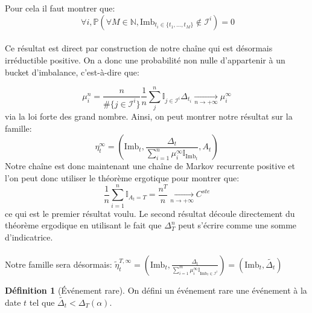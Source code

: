 \documentclass[12pt,a4paper]{article}
\theoremstyle{definition}
\newtheorem{definition}[theorem]{Définition}
\theoremstyle{remark}
\begin{document}
\\
\\
Pour cela il faut montrer que:
$$ \ \forall i,  \mathbb{P}\left(\forall M \in \mathbb{N}, \text{Imb}_{t_i\in\{t_1,\dots,t_M\}}\notin \mathcal{I}^{i}\right) = 0$$
\\
Ce résultat est direct par construction de notre chaîne qui est désormais irréductible positive. On a donc une probabilité non nulle d'appartenir à un bucket d'imbalance, c'est-à-dire que:

$$\mu_i^n = \frac{n}{\#\{j\in \mathcal I^i\}}\frac{1}{n}\sum_{j}^n\mathbb{I}_{j\in \mathcal I^i}\Delta_{t_i}\underset{n\to+\infty}{\to}\mu_i^{\infty}$$
via la loi forte des grand nombre. Ainsi, on peut montrer notre résultat sur la famille:
$$\eta_t^{\infty} = \left(\text{Imb}_t, \frac{\Delta_t}{\sum_{i=1}^n\mu_i^{\infty}\mathbb{I}_{\text{Imb}_t}}, A_t\right)$$
Notre chaîne est donc maintenant une chaîne de Markov recurrente positive et l'on peut donc utiliser le théorème ergotique pour montrer que:
$$\frac{1}{n}\sum_{i=1}^n\mathbb{I}_{A_t=T} = \frac{n^T}{n} \underset{n\to+\infty}{\to} C^{ste}$$
ce qui est le premier résultat voulu. Le second résultat découle directement du théorème ergodique en utilisant le fait que $\Delta_T^n$ peut s'écrire comme une somme d'indicatrice. 
\\
\\
Notre famille sera désormais: 
$\tilde \eta_t^{T,\infty} = \left(\text{Imb}_t, \frac{\Delta_t}{\sum_{i=1}^m\mu_i^{\infty}\mathbb{I}_{\text{Imb}_t\in\mathcal{I}^{i}}}\right)=\left(\text{Imb}_t, \tilde{\Delta_t}\right)$
\begin{definition}[Événement rare]
On défini un événement rare une événement à la date $t$ tel que $\tilde{\Delta_t}<\Delta_T(\alpha)$.
    
\end{definition}
\end{document}
